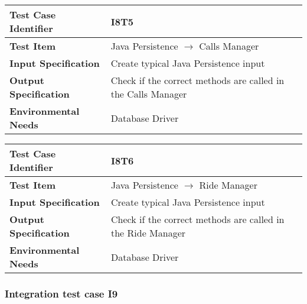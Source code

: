 \begin{table}[!htbp]
\begin{center}
\begin{tabular}[t]{p{}p{}}

\hline
\textbf{Test Case Identifier} & I8T5 \\
\hline
\textbf{Test Item} & Java Persistence $\rightarrow$ Calls Manager \\
\hline
\textbf{Input Specification} & Create typical Java Persistence input \\
\hline
\textbf{Output Specification} & Check if the correct methods are called in the Calls Manager \\
\hline
\textbf{Environmental Needs} & Database Driver \\
\hline

\end{tabular}
\end{center}
\end{table}

\begin{table}[!htbp]
\begin{center}
\begin{tabular}[t]{p{}p{}}

\hline
\textbf{Test Case Identifier} & I8T6 \\
\hline
\textbf{Test Item} & Java Persistence $\rightarrow$ Ride Manager \\
\hline
\textbf{Input Specification} & Create typical Java Persistence input \\
\hline
\textbf{Output Specification} & Check if the correct methods are called in the Ride Manager \\
\hline
\textbf{Environmental Needs} & Database Driver \\
\hline

\end{tabular}
\end{center}
\end{table}
\clearpage


\subsubsection{Integration test case I9}

